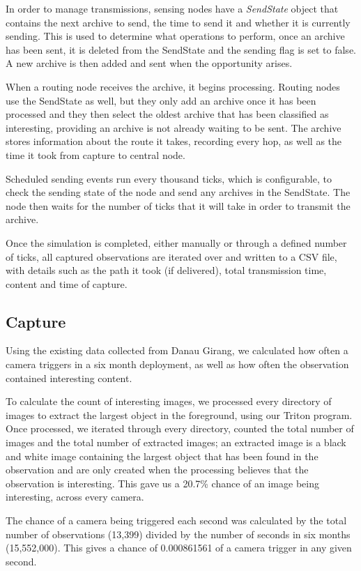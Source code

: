 	In order to manage transmissions, sensing nodes have a \textit{SendState} object that contains the next archive to send, the time to send it and whether it is currently sending. This is used to determine what operations to perform, once an archive has been sent, it is deleted from the SendState and the sending flag is set to false. A new archive is then added and sent when the opportunity arises.
	
	When a routing node receives the archive, it begins processing. Routing nodes use the SendState as well, but they only add an archive once it has been processed and they then select the oldest archive that has been classified as interesting, providing an archive is not already waiting to be sent. The archive stores information about the route it takes, recording every hop, as well as the time it took from capture to central node.
	
	Scheduled sending events run every thousand ticks, which is configurable, to check the sending state of the node and send any archives in the SendState. The node then waits for the number of ticks that it will take in order to transmit the archive.
	
	Once the simulation is completed, either manually or through a defined number of ticks, all captured observations are iterated over and written to a CSV file, with details such as the path it took (if delivered), total transmission time, content and time of capture.
	
\subsection{Capture}\label{sims:exp:cap}
	Using the existing data collected from Danau Girang, we calculated how often a camera triggers in a six month deployment, as well as how often the observation contained interesting content. 
	
	To calculate the count of interesting images, we processed every directory of images to extract the largest object in the foreground, using our Triton program. Once processed, we iterated through every directory, counted the total number of images and the total number of extracted images; an extracted image is a black and white image containing the largest object that has been found in the observation and are only created when the processing believes that the observation is interesting. This gave us a 20.7\% chance of an image being interesting, across every camera.
	
	The chance of a camera being triggered each second was calculated by the total number of observations (13,399) divided by the number of seconds in six months (15,552,000). This gives a chance of 0.000861561 of a camera trigger in any given second.
	
